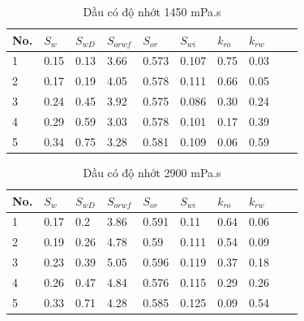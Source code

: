 \documentclass[12pt,a4paper]{article}
\begin{document}
\begin{table}[h]
\centering
\caption{Dầu có độ nhớt 1450 mPa.s}
\label{my-label}
\begin{tabularx}{\textwidth}{@{}XXXXXXXXXX@{}}
\toprule
No. & $S_w$ & $S_{wD}$ & $S_{orwf}$ & $S_{or}$ & $S_{wi}$ & $k_{ro}$ & $k_{rw}$ \\ \midrule
1  & 0.15  & 0.13     & 3.66       & 0.573    & 0.107    & 0.75     & 0.03     \\
2  & 0.17  & 0.19     & 4.05       & 0.578    & 0.111    & 0.66     & 0.05     \\
3  & 0.24  & 0.45     & 3.92       & 0.575    & 0.086    & 0.30     & 0.24     \\
4  & 0.29  & 0.59     & 3.03       & 0.578    & 0.101    & 0.17     & 0.39     \\
5  & 0.34  & 0.75     & 3.28       & 0.581    & 0.109    & 0.06     & 0.59     \\ \bottomrule
\end{tabularx}
\end{table}

\begin{table}[h]
\centering
\caption{Dầu có độ nhớt 2900 mPa.s}
\label{my-label}
\begin{tabularx}{\textwidth}{@{}XXXXXXXXXX@{}}
\toprule
No. & $S_w$ & $S_{wD}$ & $S_{orwf}$ & $S_{or}$ & $S_{wi}$ & $k_{ro}$ & $k_{rw}$ \\ \midrule
1   & 0.17  & 0.2      & 3.86       & 0.591    & 0.11     & 0.64     & 0.06     \\
2   & 0.19  & 0.26     & 4.78       & 0.59     & 0.111    & 0.54     & 0.09     \\
3   & 0.23  & 0.39     & 5.05       & 0.596    & 0.119    & 0.37     & 0.18     \\
4   & 0.26  & 0.47     & 4.84       & 0.576    & 0.115    & 0.29     & 0.26     \\
5   & 0.33  & 0.71     & 4.28       & 0.585    & 0.125    & 0.09     & 0.54     \\ \bottomrule
\end{tabularx}
\end{table}
\end{document}
